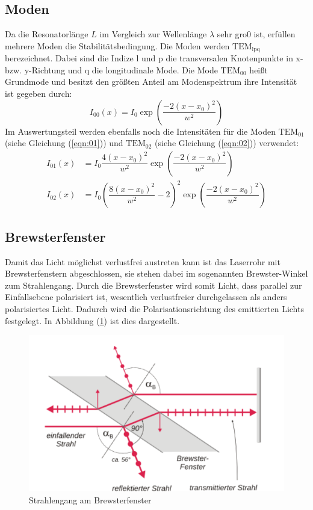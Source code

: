 \subsection{Moden}
\label{sec:modee}
Da die Resonatorlänge $L$ im  Vergleich zur Wellenlänge $\lambda$ sehr gro0 ist, erfüllen mehrere Moden die Stabilitätsbedingung. Die Moden werden $\mathrm{TEM}_\mathrm{lpq}$ berezeichnet. Dabei sind die Indize l und p die transversalen Knotenpunkte
in x- bzw. y-Richtung und q die longitudinale Mode. Die Mode $\mathrm{TEM}_\mathrm{00}$ heißt Grundmode und besitzt den größten Anteil am Modenspektrum ihre Intensität ist gegeben durch:
\begin{equation}
  \label{eqn:grundmode}
  I_\mathrm{00}(x)=I_\mathrm{0}\exp\left(\dfrac{-2(x-x_\mathrm{0})^2}{w^2}\right)
\end{equation}
Im Auswertungsteil werden ebenfalls noch die Intensitäten für die Moden $\mathrm{TEM}_\mathrm{01}$ (siehe Gleichung (\ref{eqn:01})) und $\mathrm{TEM}_\mathrm{02}$ (siehe Gleichung (\ref{eqn:02})) verwendet:
\begin{align}
  \label{eqn:01}
  I_\mathrm{01}(x)&=I_\mathrm{0}\dfrac{4(x-x_\mathrm{0})^2}{w^2}\exp\left(\dfrac{-2(x-x_\mathrm{0})^2}{w^2}\right) \\
  \label{eqn:02}
  I_\mathrm{02}(x)&=I_\mathrm{0}\left(\dfrac{8(x-x_\mathrm{0})^2}{w^2}-2\right)^2\exp\left(\dfrac{-2(x-x_\mathrm{0})^2}{w^2}\right)
\end{align}
\subsection{Brewsterfenster}
\label{sec:brews}
Damit das Licht möglichst verlustfrei austreten kann ist das Laserrohr mit Brewsterfenstern abgeschlossen, sie stehen dabei im sogenannten Brewster-Winkel zum Strahlengang. Durch die Brewsterfenster wird somit Licht, dass parallel
zur Einfallsebene polarisiert ist, wesentlich verlustfreier durchgelassen als anders polarisiertes Licht. Dadurch wird die Polarisationsrichtung des emittierten Lichts festgelegt. In Abbildung (\ref{fig:brew}) ist dies dargestellt.
\begin{figure}[h!]
  \centering
  \includegraphics[scale=0.5]{fig/brew.png}
  \caption{Strahlengang am Brewsterfenster \cite{Anleitung6}}
  \label{fig:brew}
\end{figure}
